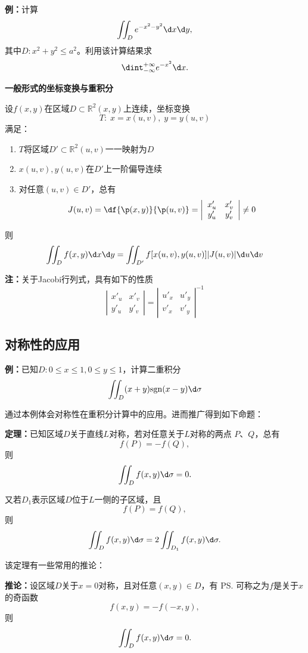 {\bf 例：}计算
$$\iint_De^{-x^2-y^2}\d x\d y,$$
其中$D:x^2+y^2\leq a^2$。利用该计算结果求
$$\dint_{-\infty}^{+\infty}e^{-x^2}\d x.$$

\begin{shaded}
	{\bf 一般形式的坐标变换与重积分}
	
	设$f(x,y)$在区域$D\subset\mathbb{R}^2(x,y)$上连续，坐标变换
	$$T:\;x=x(u,v),\;y=y(u,v)$$
	满足：
	\begin{enumerate}[(1)]
	  \item $T$将区域$D'\subset\mathbb{R}^2(u,v)$一一映射为$D$
	  \item $x(u,v),y(u,v)$在$D'$上一阶偏导连续
	  \item 对任意$(u,v)\in D'$，总有
	  $$J(u,v)=\df{\p(x,y)}{\p(u,v)}=\left|\begin{array}{cc}
	  	x'_u & x'_v \\ y'_u & y'_v
	  \end{array}\right|\ne 0$$
	\end{enumerate}
	则
	$$\iint_Df(x,y)\d x\d y=\iint_{D'}f[x(u,v),y(u,v)]|J(u,v)|\d u\d v$$
	
	{\bf 注：}关于Jacobi行列式，具有如下的性质
	$$\left|\begin{array}{cc}
	  	x'_u & x'_v \\ y'_u & y'_v
	  \end{array}\right|
	  =\left|\begin{array}{cc}
	  	u'_x & u'_y \\ v'_x & v'_y
	  \end{array}\right|^{-1}$$
\end{shaded}

\subsection{对称性的应用}

{\bf 例：}已知$D:0\leq x\leq1,0\leq y\leq1$，计算二重积分
$$\iint_D(x+y)\mathrm{sgn}(x-y)\d\sigma$$

通过本例体会对称性在重积分计算中的应用。进而推广得到如下命题：

{\bf 定理：}已知区域$D$关于直线$L$对称，若对任意关于$L$对称的两点
$P$、$Q$，总有
$$f(P)=-f(Q),$$
则
$$\iint_Df(x,y)\d\sigma=0.$$

又若$D_1$表示区域$D$位于$L$一侧的子区域，且
$$f(P)=f(Q),$$
则
$$\iint_Df(x,y)\d\sigma=2\iint_{D_1}f(x,y)\d\sigma.$$

该定理有一些常用的推论：

{\bf 推论：}设区域$D$关于$x=0$对称，且对任意$(x,y)\in D$，有
\ps{可称之为$f$是关于$x$的奇函数}
$$f(x,y)=-f(-x,y),$$
则
$$\iint_Df(x,y)\d\sigma=0.$$

